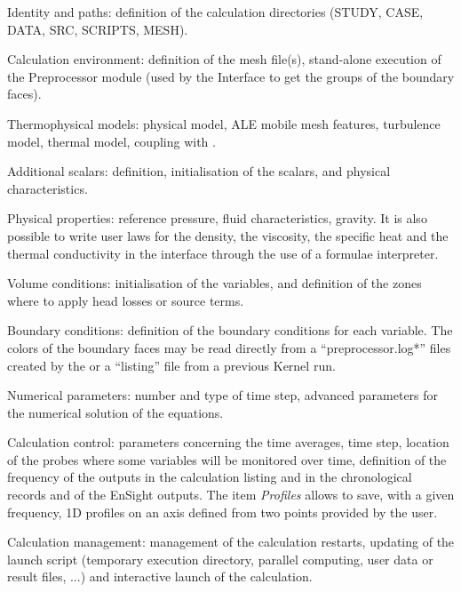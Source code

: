 {{{\begin{list}{-}{}
\item Identity and paths: definition of the calculation directories
      (STUDY, CASE, DATA, SRC, SCRIPTS, MESH).

\item Calculation environment: definition of the mesh file(s),
      stand-alone execution of the Preprocessor module
      (used by the Interface to get the groups of the boundary
      faces).

\item Thermophysical models: physical model, ALE mobile mesh features,
      turbulence model, thermal model, coupling with \syrthes.

\item Additional scalars: definition, initialisation of the scalars,
      and physical characteristics.

\item Physical properties: reference pressure, fluid characteristics, gravity.
      It is also possible to write user laws for the density, the viscosity,
      the specific heat and the thermal conductivity in the interface through
      the use of a formulae interpreter.

\item Volume conditions: initialisation of the variables, and definition of
      the zones where to apply head losses or source terms.

\item Boundary conditions: definition of the boundary conditions for
      each variable. The colors of the boundary faces may be read
      directly from a ``preprocessor.log*'' files created by the \pcs
      or a ``listing'' file from a previous Kernel run.

\item Numerical parameters: number and type of time step, advanced parameters
      for the numerical solution of the equations.

\item Calculation control: parameters concerning the time averages, time step,
      location of
      the probes where some variables will be monitored over time,
      definition of the frequency of the outputs in the calculation
      listing and in the chronological records and of the EnSight outputs.
      The item {\itshape Profiles} allows to save, with a  given frequency,
      1D profiles on an axis defined from two points provided by the user.

\item Calculation management: management of the calculation restarts,
      updating of the launch script (temporary execution directory, parallel
      computing, user data or result files, ...) and interactive launch of the
      calculation.


\end{list}}}}
